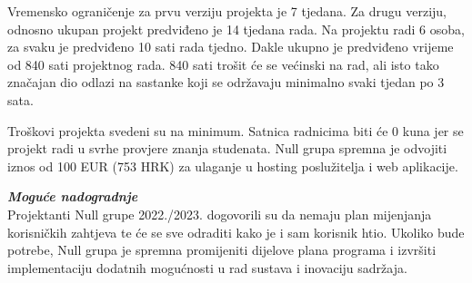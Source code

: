 \texttt{}{
Vremensko ograničenje za prvu verziju projekta je 7 tjedana. Za drugu verziju, odnosno ukupan projekt predviđeno je 14 tjedana rada. Na projektu radi 6 osoba, za svaku je predviđeno 10 sati rada tjedno. Dakle ukupno je predviđeno vrijeme od 840 sati projektnog rada. 840 sati trošit će se većinski na rad, ali isto tako značajan dio odlazi na sastanke koji se održavaju minimalno svaki tjedan po 3 sata.
}
\newline


\texttt{}{
Troškovi projekta svedeni su na minimum. Satnica radnicima biti će 0 kuna jer se projekt radi u svrhe provjere znanja studenata. Null grupa spremna je odvojiti iznos od 100 EUR (753 HRK) za ulaganje u hosting poslužitelja i web aplikacije.
}\newline



              \textbf{\textit{Moguće nadogradnje}}\\

\texttt{}{
Projektanti Null grupe 2022./2023. dogovorili su da nemaju plan mijenjanja korisničkih zahtjeva te će se sve odraditi kako je i sam korisnik htio. Ukoliko bude potrebe, Null grupa je spremna 
 promijeniti dijelove plana programa i izvršiti implementaciju dodatnih mogućnosti u rad sustava i inovaciju sadržaja. 
}



        
		

		
		
		
